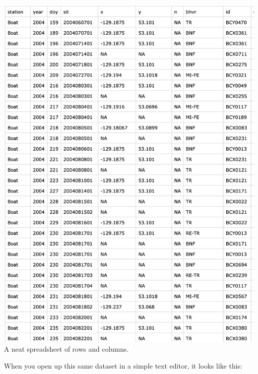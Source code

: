 \documentclass[]{book}
\begin{document}
\includegraphics{img/csv.png}
A neat spreadsheet of rows and columns.

When you open up this same dataset in a simple text editor, it looks like this:
\end{document}
